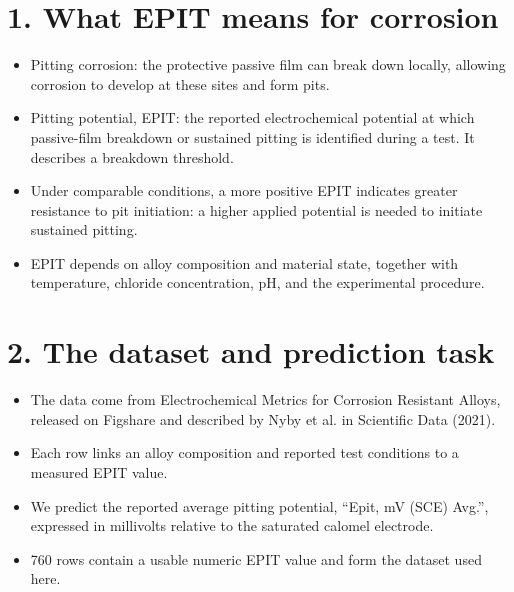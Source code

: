 \documentclass[11pt]{article}
\newenvironment{notes}
  {\begin{itemize}\setlength{\itemsep}{0.45em}\setlength{\parsep}{0pt}}
  {\end{itemize}}
\begin{document}

\section*{1. What EPIT means for corrosion}

\begin{notes}

    \item Pitting corrosion: the protective passive film can break down locally, allowing
    corrosion to develop at these sites and form pits.

    \item Pitting potential, EPIT: the reported electrochemical potential at which
    passive-film breakdown or sustained pitting is identified during a test. It describes a
    breakdown threshold.

    \item Under comparable conditions, a more positive EPIT indicates greater resistance to
    pit initiation: a higher applied potential is needed to initiate sustained pitting.

    \item EPIT depends on alloy composition and material state, together with temperature,
    chloride concentration, pH, and the experimental procedure.

\end{notes}

\section*{2. The dataset and prediction task}

\begin{notes}

    \item The data come from Electrochemical Metrics for Corrosion Resistant Alloys,
    released on Figshare and described by Nyby et al. in Scientific Data (2021).

    \item Each row links an alloy composition and reported test conditions to a measured
    EPIT value.

    \item We predict the reported average pitting potential, “Epit, mV (SCE) Avg.”,
    expressed in millivolts relative to the saturated calomel electrode.

    \item 760 rows contain a usable numeric EPIT value and form the dataset used here.

\end{notes}
\end{document}
